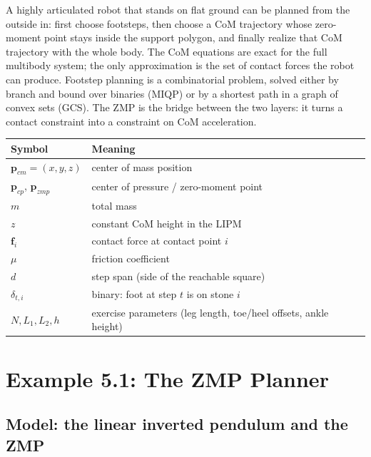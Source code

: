 \documentclass[11pt]{article}
\newcommand{\bp}{\mathbf{p}}
\begin{document}
\begin{intuition}[breakable=false,title={The big picture in five sentences}]
A highly articulated robot that stands on flat ground can be planned from the
outside in: first choose footsteps, then choose a CoM trajectory whose
zero-moment point stays inside the support polygon, and finally realize that
CoM trajectory with the whole body.  The CoM equations are exact for the full
multibody system; the only approximation is the set of contact forces the
robot can produce.  Footstep planning is a combinatorial problem, solved
either by branch and bound over binaries (MIQP) or by a shortest path in a
graph of convex sets (GCS).  The ZMP is the bridge between the two layers: it
turns a contact constraint into a constraint on CoM acceleration.
\end{intuition}

\begin{center}
\small
\begin{tabular}{ll}
\toprule
Symbol & Meaning \\
\midrule
$\bp_{cm}=(x,y,z)$ & center of mass position \\
$\bp_{cp}$, $\bp_{zmp}$ & center of pressure / zero-moment point \\
$m$ & total mass \\
$z$ & constant CoM height in the LIPM \\
$\mathbf{f}_i$ & contact force at contact point $i$ \\
$\mu$ & friction coefficient \\
$d$ & step span (side of the reachable square) \\
$\delta_{t,i}$ & binary: foot at step $t$ is on stone $i$ \\
$N,L_1,L_2,h$ & exercise parameters (leg length, toe/heel offsets, ankle height) \\
\bottomrule
\end{tabular}
\end{center}

\section{Example 5.1: The ZMP Planner}

\subsection{Model: the linear inverted pendulum and the ZMP}
\end{document}
